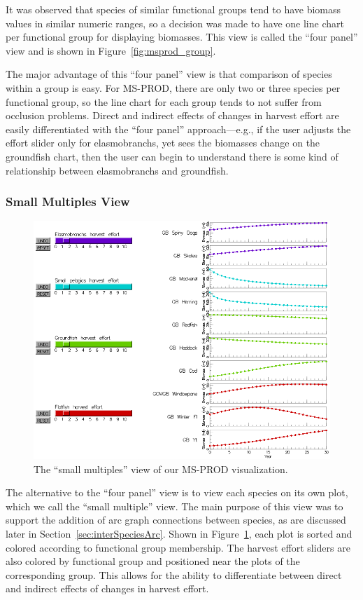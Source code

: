 It was observed that species of similar functional groups tend to have biomass values in similar numeric ranges, so a decision was made to have one line chart per functional group for displaying biomasses.  This view is called the ``four panel'' view and is shown in Figure~\ref{fig:msprod_group}.

The major advantage of this ``four panel'' view is that comparison of species within a group is easy.  For MS-PROD, there are only two or three species per functional group, so the line chart for each group tends to not suffer from occlusion problems.  Direct and indirect effects of changes in harvest effort are easily differentiated with the ``four panel'' approach---e.g., if the user adjusts the effort slider only for elasmobranchs, yet sees the biomasses change on the groundfish chart, then the user can begin to understand there is some kind of relationship between elasmobranchs and groundfish.

\subsubsection{Small Multiples View}

\begin{figure}[h]
	\centering
	\includegraphics[width=12cm]{figures/png/msprod_species.png}
	\caption{The ``small multiples'' view of our MS-PROD visualization.}
	\label{fig:msprod_species}
\end{figure}

The alternative to the ``four panel'' view is to view each species on its own plot, which we call the ``small multiple'' view.  The main purpose of this view was to support the addition of arc graph connections between species, as are discussed later in Section~\ref{sec:interSpeciesArc}. Shown in Figure~\ref{fig:msprod_species}, each plot is sorted and colored according to functional group membership.  The harvest effort sliders are also colored by functional group and positioned near the plots of the corresponding group.  This allows for the ability to differentiate between direct and indirect effects of changes in harvest effort.

